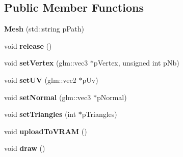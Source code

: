 \subsection*{\-Public \-Member \-Functions}
\begin{DoxyCompactItemize}
\item 
\hypertarget{classde_1_1data_1_1_mesh_addb8861b2351da42135689571264ee04}{
{\bfseries \-Mesh} (std\-::string p\-Path)}
\label{classde_1_1data_1_1_mesh_addb8861b2351da42135689571264ee04}

\item 
\hypertarget{classde_1_1data_1_1_mesh_a3fed7c0c97c9ec90cf5492ddf004ad1f}{
void {\bfseries release} ()}
\label{classde_1_1data_1_1_mesh_a3fed7c0c97c9ec90cf5492ddf004ad1f}

\item 
\hypertarget{classde_1_1data_1_1_mesh_a839129c4498eeed6fec0c7a8f2fd37b7}{
void {\bfseries set\-Vertex} (glm\-::vec3 $\ast$p\-Vertex, unsigned int p\-Nb)}
\label{classde_1_1data_1_1_mesh_a839129c4498eeed6fec0c7a8f2fd37b7}

\item 
\hypertarget{classde_1_1data_1_1_mesh_a36ad426209872f9f20ad1dcbdc1bab5b}{
void {\bfseries set\-U\-V} (glm\-::vec2 $\ast$p\-Uv)}
\label{classde_1_1data_1_1_mesh_a36ad426209872f9f20ad1dcbdc1bab5b}

\item 
\hypertarget{classde_1_1data_1_1_mesh_a37d002f94e2bbc71cc429f998ea6f308}{
void {\bfseries set\-Normal} (glm\-::vec3 $\ast$p\-Normal)}
\label{classde_1_1data_1_1_mesh_a37d002f94e2bbc71cc429f998ea6f308}

\item 
\hypertarget{classde_1_1data_1_1_mesh_ad837f307026269a13fe7dff0ed6b4c1c}{
void {\bfseries set\-Triangles} (int $\ast$p\-Triangles)}
\label{classde_1_1data_1_1_mesh_ad837f307026269a13fe7dff0ed6b4c1c}

\item 
\hypertarget{classde_1_1data_1_1_mesh_a5cd5aa76a532398e63aca29042dce0e1}{
void {\bfseries upload\-To\-V\-R\-A\-M} ()}
\label{classde_1_1data_1_1_mesh_a5cd5aa76a532398e63aca29042dce0e1}

\item 
\hypertarget{classde_1_1data_1_1_mesh_a7b8548c48d672c9bc085ecd906498e33}{
void {\bfseries draw} ()}
\label{classde_1_1data_1_1_mesh_a7b8548c48d672c9bc085ecd906498e33}

\end{DoxyCompactItemize}
